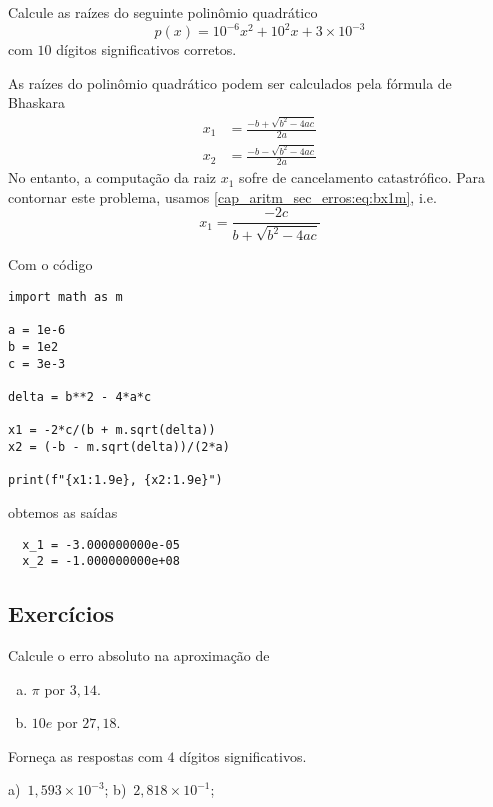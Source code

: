 \begin{exeresol}
  Calcule as raízes do seguinte polinômio quadrático
  \begin{equation}
    p(x) = 10^{-6}x^2 + 10^2x + 3\times 10^{-3}
  \end{equation}
  com $10$ dígitos significativos corretos.
\end{exeresol}
\begin{resol}
  As raízes do polinômio quadrático podem ser calculados pela fórmula de Bhaskara
  \begin{align}
    x_1 &= \frac{-b + \sqrt{b^2 - 4ac}}{2a}\label{cap_aritm_sec_erros:eq:bx1}\\
    x_2 &= \frac{-b - \sqrt{b^2 - 4ac}}{2a}
  \end{align}
  No entanto, a computação da raiz $x_1$ sofre de cancelamento catastrófico. Para contornar este problema, usamos \eqref{cap_aritm_sec_erros:eq:bx1m}, i.e.
  \begin{equation}
    x_1 = \frac{-2c}{b + \sqrt{b^2 - 4ac}}
  \end{equation}

  
  Com o código

\begin{lstlisting}
import math as m

a = 1e-6
b = 1e2
c = 3e-3

delta = b**2 - 4*a*c

x1 = -2*c/(b + m.sqrt(delta))
x2 = (-b - m.sqrt(delta))/(2*a)

print(f"{x1:1.9e}, {x2:1.9e}")
\end{lstlisting}

obtemos as saídas

\begin{verbatim}
  x_1 = -3.000000000e-05
  x_2 = -1.000000000e+08
\end{verbatim}
  
\end{resol}

\subsection{Exercícios}

\begin{exer}\label{exer:erro_abs}
  Calcule o erro absoluto na aproximação de
  \begin{enumerate}[a)]
  \item $\pi$ por $3,14$.
  \item $10e$ por $27,18$.
  \end{enumerate}
  Forneça as respostas com $4$ dígitos significativos.
\end{exer}
\begin{resp}
  a)~$1,593\times 10^{-3}$; b)~$2,818\times 10^{-1}$;
\end{resp}

